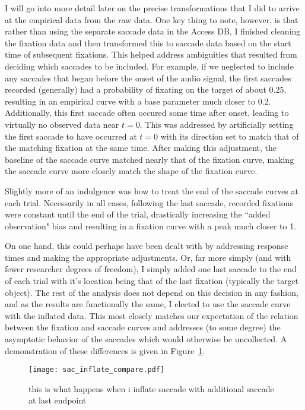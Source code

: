 I will go into more detail later on the precise transformations that I did to arrive at the empirical data from the raw data.  One key thing to note, however, is that rather than using the separate saccade data in the Access DB, I finished cleaning the fixation data and then transformed this to saccade data based on the start time of subsequent fixations. This helped address ambiguities that resulted from deciding which saccades to be included. For example, if we neglected to include any saccades that began before the onset of the audio signal, the first saccades recorded (generally) had a probability of fixating on the target of about 0.25, resulting in an empirical curve with a base parameter much closer to 0.2. Additionally, this first saccade often occured some time after onset, leading to virtually no observed data near $t = 0$. This was addressed by artificially setting the first saccade to have occurred at $t = 0$ with its direction set to match that of the matching fixation at the same time. After making this adjustment, the baseline of the saccade curve matched nearly that of the fixation curve, making the saccade curve more closely match the shape of the fixation curve.

Slightly more of an indulgence was how to treat the end of the saccade curves at each trial. Necessarily in all cases, following the last saccade, recorded fixations were constant until the end of the trial, drastically increasing the ``added observation" bias and resulting in a fixation curve with a peak much closer to 1.

On one hand, this could perhaps have been dealt with by addressing response times and making the appropriate adjustments. Or, far more simply (and with fewer researcher degrees of freedom), I simply added one last saccade to the end of each trial with it's location being that of the last fixation (typically the target object). The rest of the analysis does not depend on this decision in any fashion, and as the results are functionally the same, I elected to use the saccade curve with the inflated data. This most closely matches our expectation of the relation between the fixation and saccade curves and addresses (to some degree) the asymptotic behavior of the saccades which would otherwise be uncollected. A demonstration of these differences is given in Figure~\ref{fig:saccade_inflate}.

\begin{figure}
\centering
\texttt{[image: sac\_inflate\_compare.pdf]}
\caption{this is what happens when i inflate saccade with additional saccade at last endpoint}
\label{fig:saccade_inflate}
\end{figure}

